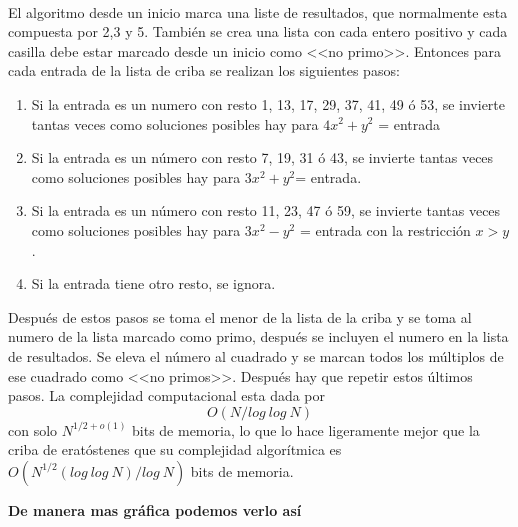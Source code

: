 \documentclass[11pt, conference]{IEEEtran}
\begin{document}
\

El algoritmo desde un inicio marca una liste de resultados, que normalmente esta compuesta por 2,3 y 5. También se crea una lista con cada entero positivo y cada casilla debe estar marcado desde un inicio como <<no primo>>. Entonces para cada entrada de la lista de criba se realizan los siguientes pasos:
\begin{enumerate}
	\item Si la entrada es un numero con resto  1, 13, 17, 29, 37, 41, 49 ó 53, se invierte tantas veces como soluciones posibles hay para $4x^{2} + y^{2}$ = entrada
	\item Si la entrada es un número con resto 7, 19, 31 ó 43, se invierte tantas veces como soluciones posibles hay para $3x^{2} + y^{2}$= entrada.
	\item Si la entrada es un número con resto 11, 23, 47 ó 59, se invierte tantas veces como soluciones posibles hay para $3x^{2} - y^{2}$ = entrada con la restricción $x > y$.
	\item Si la entrada tiene otro resto, se ignora.
\end{enumerate}
Después de estos pasos se toma el menor de la lista de la criba y se toma al numero de la lista marcado como primo, después se incluyen el numero en la lista de resultados.
Se eleva el número al cuadrado y se marcan todos los múltiplos de ese cuadrado como <<no primos>>. Después hay que repetir estos últimos pasos.
La complejidad computacional esta dada por
\[O(N/log\ log\ N)\] con solo $N^{1/2+o(1)}$ bits de memoria, lo que lo hace ligeramente mejor que la criba de eratóstenes que su complejidad algorítmica es $O(N^{1/2}(log\ log\ N)/log\ N)$ bits de memoria.

\textbf{De manera mas gráfica podemos verlo así}
\end{document}
